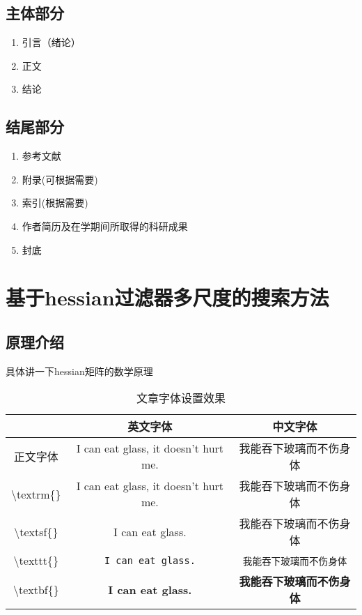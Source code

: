\section{主体部分}
\begin{enumerate}
	\item 引言（绪论）
	\item 正文
	\item 结论
\end{enumerate}
\section{结尾部分}
\begin{enumerate}
	\item 参考文献
	\item 附录(可根据需要)
	\item 索引(根据需要)
	\item 作者简历及在学期间所取得的科研成果
	\item 封底
\end{enumerate}
\chapter{基于hessian过滤器多尺度的搜索方法}
\section{原理介绍}
具体讲一下hessian矩阵的数学原理
\begin{table}[htb]
	\caption{文章字体设置效果}
	\label{tab:文章字体设置效果}
	\begin{center}
		\begin{tabular}{ccc}
			\toprule
					& 英文字体 & 中文字体  \\
			\midrule
			正文字体 & I can eat glass, it doesn't hurt me. & 我能吞下玻璃而不伤身体 \\
			\textbackslash textrm\{\} & \textrm{I can eat glass, it doesn't hurt me.} & \textrm{我能吞下玻璃而不伤身体} \\
			\textbackslash textsf\{\} & \textsf{I can eat glass.} & \textsf{我能吞下玻璃而不伤身体} \\
			\textbackslash texttt\{\} & \texttt{I can eat glass.} & \texttt{我能吞下玻璃而不伤身体} \\
			\textbackslash textbf\{\} & \textbf{I can eat glass.} & \textbf{我能吞下玻璃而不伤身体} \\
			\bottomrule
		\end{tabular}
	\end{center}
\end{table}

